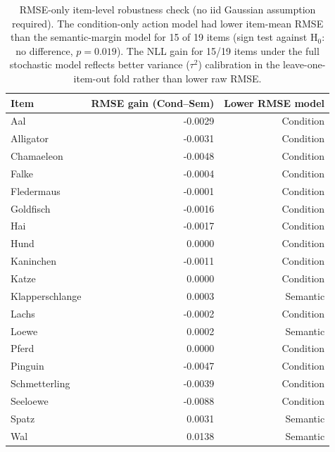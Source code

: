 \begin{table}[htbp]
\centering
\caption{RMSE-only item-level robustness check (no iid Gaussian assumption required). The condition-only action model had lower item-mean RMSE than the semantic-margin model for 15 of 19 items (sign test against H$_0$: no difference, $p = 0.019$). The NLL gain for 15/19 items under the full stochastic model reflects better variance (\(\tau^2\)) calibration in the leave-one-item-out fold rather than lower raw RMSE.}
\label{tab:robustness-rmse}
\begin{tabular}{lrr}
\toprule
Item & RMSE gain (Cond--Sem) & Lower RMSE model \\
\midrule
Aal & -0.0029 & Condition \\
Alligator & -0.0031 & Condition \\
Chamaeleon & -0.0048 & Condition \\
Falke & -0.0004 & Condition \\
Fledermaus & -0.0001 & Condition \\
Goldfisch & -0.0016 & Condition \\
Hai & -0.0017 & Condition \\
Hund & 0.0000 & Condition \\
Kaninchen & -0.0011 & Condition \\
Katze & 0.0000 & Condition \\
Klapperschlange & 0.0003 & Semantic \\
Lachs & -0.0002 & Condition \\
Loewe & 0.0002 & Semantic \\
Pferd & 0.0000 & Condition \\
Pinguin & -0.0047 & Condition \\
Schmetterling & -0.0039 & Condition \\
Seeloewe & -0.0088 & Condition \\
Spatz & 0.0031 & Semantic \\
Wal & 0.0138 & Semantic \\
\bottomrule
\end{tabular}
\end{table}